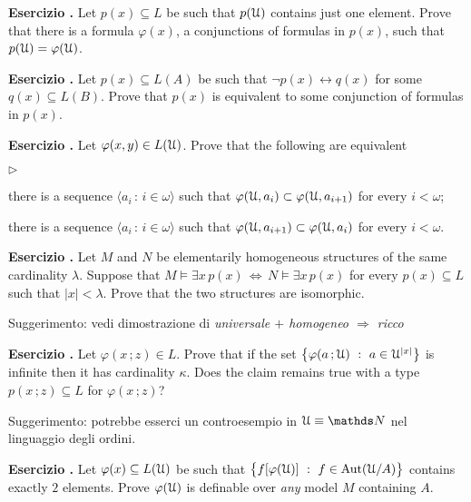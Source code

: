 \documentclass[10pt]{article}
\def\phi{\varphi}
\def\U{\EuScript U}
\def\NN{\mathds N}
\def\<{\langle}
\def\>{\rangle}
\def\E{\exists}
\def\iff{\leftrightarrow}
\def\IMP{\Rightarrow}
\def\IFF{\Leftrightarrow}
\def\Aut{\textrm{Aut}}
\newcommand{\labella}[1]{{\sf\footnotesize #1}\hfill}
\renewenvironment{itemize}
  {\begin{list}{$\triangleright$}{%
   \setlength{\parskip}{0mm}
   \setlength{\topsep}{0mm}
   \setlength{\rightmargin}{0mm}
   \setlength{\listparindent}{0mm}
   \setlength{\itemindent}{0mm}
   \setlength{\labelwidth}{3ex}
   \setlength{\itemsep}{0mm}
   \setlength{\parsep}{0mm}
   \setlength{\partopsep}{0mm}
   \setlength{\labelsep}{1ex}
   \setlength{\leftmargin}{\labelwidth+\labelsep}
   \let\makelabel\labella}}{%
   \end{list}}
\newcounter{ex}
\newenvironment{exercise}{\clearpage\addtocounter{ex}{1}\textbf{Esercizio \theex.\quad}}{}
\begin{document}
\clearpage%
\setcounter{ex}{0}

\begin{exercise}
Let $p(x)\subseteq L$ be such that $p(\U)$ contains just one element. Prove that there is a formula $\phi(x)$, a conjunctions of formulas in $p(x)$, such that $p(\U)=\phi(\U)$.
\end{exercise}

\begin{exercise}
Let $p(x)\subseteq L(A)$ be such that $\neg p(x)\iff q(x)$ for some $q(x)\subseteq L(B)$. Prove that $p(x)$ is equivalent to some conjunction of formulas in $p(x)$.
\end{exercise}


\begin{exercise} 
Let $\phi(x,y)\in L(\U)$. Prove that the following are equivalent
\begin{itemize}
\item[1.] there is a sequence $\<a_i\,:\,i\in\omega\>$ such that $\phi(\U,a_i)\subset\phi(\U,a_{i+1})$ for every $i<\omega$;
\item[2.] there is a sequence $\<a_i\,:\,i\in\omega\>$ such that $\phi(\U,a_{i+1})\subset\phi(\U,a_i)$ for every $i<\omega$.  
\end{itemize}
\end{exercise}

\clearpage%
\setcounter{ex}{0}

\begin{exercise}
Let $M$ and $N$ be elementarily homogeneous structures of the same cardinality $\lambda$. Suppose that $M\models\E x\, p(x)\,\IFF\,N\models\E x\, p(x)$ for every $p(x)\subseteq L$ such that $|x|<\lambda$. Prove that the two structures are isomorphic.

Suggerimento: vedi dimostrazione di \textit{universale $+$ homogeneo $\IMP$ ricco}
\end{exercise}


\begin{exercise}
Let $\phi(x\,;z)\in L$. Prove that if the set $\big\{\phi(a\,;\U)\ :\ a\in\U^{|x|}\big\}$ is infinite then it has cardinality $\kappa$. Does the claim remains true with a type $p(x\,;z)\subseteq L$ for $\phi(x\,;z)$?

Suggerimento: potrebbe esserci un controesempio in $\U\equiv\NN$ nel linguaggio degli ordini.
\end{exercise}


\begin{exercise}
Let $\phi(x)\subseteq L(\U)$ be such that $\big\{f[\phi(\U)] \ :\ f\in\Aut(\U/A)\big\}$ contains exactly $2$ elements.  Prove $\phi(\U)$ is definable over \textit{any\/} model $M$ containing $A$.
\end{exercise}
\end{document}
